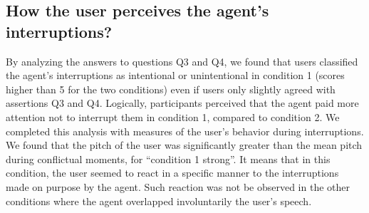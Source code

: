 \begin{table}
\centering
{}
\caption{Mean agreements of the participants for conditions 1 and condition 2 (translated from French).}
\label{Answers}
\end{table}

\subsection{How the user perceives the agent's interruptions?}

By analyzing the answers to questions Q3 and Q4, we found that users classified the agent's interruptions as intentional or unintentional in condition 1 (scores higher than 5 for the two conditions) even if users only slightly agreed with assertions Q3 and Q4. Logically, participants perceived that the agent paid more attention not to interrupt them in condition 1, compared to condition 2. 
We completed this analysis with measures of the user's behavior during interruptions. We found that the pitch of the user was significantly greater than the mean pitch during conflictual moments, for ``condition 1 strong''. It means that in this condition, the user seemed to react in a specific manner to the interruptions made on purpose by the agent. Such reaction was not be observed in the other conditions where the agent overlapped involuntarily the user's speech.


